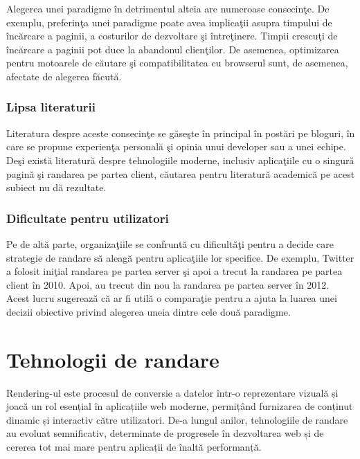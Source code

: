 \documentclass[12pt, a4paper]{report}
\begin{document}
Alegerea unei paradigme \^ in detrimentul alteia are numeroase consecin\c te. De exemplu, preferin\c ta unei paradigme poate avea implica\c tii asupra timpului de \^ inc\u arcare a paginii, a costurilor de dezvoltare \c si \^ intre\c tinere. Timpii crescu\c ti de \^ inc\u arcare a paginii pot duce la abandonul clien\c tilor. De asemenea, optimizarea pentru motoarele de c\u autare \c si compatibilitatea cu browserul sunt, de asemenea, afectate de alegerea f\u acut\u a.

\subsection{Lipsa literaturii}
Literatura despre aceste consecin\c te se g\u ase\c ste \^ in principal \^ in post\u ari pe bloguri, \^ in care se propune experien\c ta personal\u a \c si opinia unui developer sau a unei echipe. De\c si exist\u a literatur\u a despre tehnologiile moderne, inclusiv aplica\c tiile cu o singur\u a pagin\u a \c si randarea pe partea client, c\u autarea pentru literatur\u a academic\u a pe acest subiect nu d\u a rezultate.

\subsection{Dificultate pentru utilizatori}
Pe de alt\u a parte, organiza\c tiile se confrunt\u a cu dificult\u a\c ti pentru a decide care strategie de randare s\u a aleag\u a pentru aplica\c tiile lor specifice. De exemplu, Twitter a folosit ini\c tial randarea pe partea server \c si apoi a trecut la randarea pe partea client \^ in 2010. Apoi, au trecut din nou la randarea pe partea server \^ in 2012. Acest lucru sugereaz\u a c\u a ar fi util\u a o compara\c tie pentru a ajuta la luarea unei decizii obiective privind alegerea uneia dintre cele dou\u a paradigme.


\chapter{Tehnologii de randare}

Rendering-ul este procesul de conversie a datelor într-o reprezentare vizuală și joacă un rol esențial în aplicațiile web moderne, permițând furnizarea de conținut dinamic și interactiv către utilizatori. De-a lungul anilor, tehnologiile de randare au evoluat semnificativ, determinate de progresele în dezvoltarea web și de cererea tot mai mare pentru aplicații de înaltă performanță.
\end{document}
